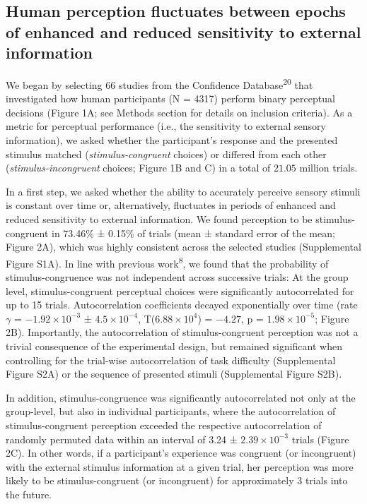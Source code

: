 \documentclass[
]{article}
\begin{document}
\hypertarget{human-perception-fluctuates-between-epochs-of-enhanced-and-reduced-sensitivity-to-external-information}{%
\subsection{Human perception fluctuates between epochs of enhanced and
reduced sensitivity to external
information}\label{human-perception-fluctuates-between-epochs-of-enhanced-and-reduced-sensitivity-to-external-information}}

We began by selecting 66 studies from the Confidence
Database\textsuperscript{20} that investigated how human participants (N
= 4317) perform binary perceptual decisions (Figure 1A; see Methods
section for details on inclusion criteria). As a metric for perceptual
performance (i.e., the sensitivity to external sensory information), we
asked whether the participant's response and the presented stimulus
matched (\emph{stimulus-congruent} choices) or differed from each other
(\emph{stimulus-incongruent} choices; Figure 1B and C) in a total of
\(21.05\) million trials.

In a first step, we asked whether the ability to accurately perceive
sensory stimuli is constant over time or, alternatively, fluctuates in
periods of enhanced and reduced sensitivity to external information. We
found perception to be stimulus-congruent in 73.46\% ± 0.15\% of trials
(mean ± standard error of the mean; Figure 2A), which was highly
consistent across the selected studies (Supplemental Figure S1A). In
line with previous work\textsuperscript{8}, we found that the
probability of stimulus-congruence was not independent across successive
trials: At the group level, stimulus-congruent perceptual choices were
significantly autocorrelated for up to 15 trials. Autocorrelation
coefficients decayed exponentially over time (rate \(\gamma\) =
\(\ensuremath{-1.92\times 10^{-3}}\) ±
\(\ensuremath{4.5\times 10^{-4}}\),
T(\(\ensuremath{6.88\times 10^{4}}\)) = \(-4.27\), p =
\(\ensuremath{1.98\times 10^{-5}}\); Figure 2B). Importantly, the
autocorrelation of stimulus-congruent perception was not a trivial
consequence of the experimental design, but remained significant when
controlling for the trial-wise autocorrelation of task difficulty
(Supplemental Figure S2A) or the sequence of presented stimuli
(Supplemental Figure S2B).

In addition, stimulus-congruence was significantly autocorrelated not
only at the group-level, but also in individual participants, where the
autocorrelation of stimulus-congruent perception exceeded the respective
autocorrelation of randomly permuted data within an interval of 3.24 ±
\ensuremath{2.39\times 10^{-3}} trials (Figure 2C). In other words, if a
participant's experience was congruent (or incongruent) with the
external stimulus information at a given trial, her perception was more
likely to be stimulus-congruent (or incongruent) for approximately 3
trials into the future.
\end{document}
